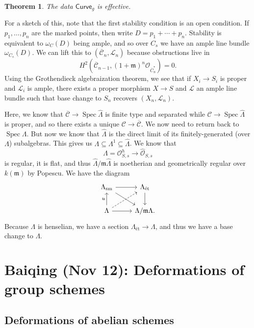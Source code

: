 \documentclass[leqno, openany]{memoir}
\newtheorem{thm}{Theorem}[section]
\theoremstyle{definition}
\theoremstyle{remark}
\theoremstyle{plain}
\theoremstyle{definition}
\theoremstyle{remark}
\newcommand{\mc}[1]{\mathcal{#1}}
\newcommand{\mf}[1]{\mathfrak{#1}}
\newcommand{\mr}[1]{\mathrm{#1}}
\newcommand{\ms}[1]{\mathsf{#1}}
\newcommand{\ol}[1]{\overline{#1}}
\newcommand{\wh}[1]{\widehat{#1}}
\DeclareMathOperator{\Spec}{Spec}
\begin{document}
\begin{thm}
    The data $\ms{Curve}_g$ is effective.
\end{thm}

For a sketch of this, note that the first stability condition is an open condition. If $p_1, \ldots, p_n$ are the marked points, then write $D = p_1 + \cdots + p_n$. Stability is equivalent to $\omega_C(D)$ being ample, and so over $C_s$ we have an ample line bundle $\omega_{C_s}(D)$. We can lift this to $(\ol{\mc{C}}_n, \mc{L}_n)$ because obstructions live in
\[ H^2(\ol{{\mc{C}}}_{n-1}, (1 + \mf{m})^n \mc{O}_{\ol{C}_n^*}) = 0. \]
Using the Grothendieck algebraization theorem, we see that if $X_i \to S_i$ is proper and $\mc{L}_i$ is ample, there exists a proper morphism $X \to S$ and $\mc{L}$ an ample line bundle such that base change to $S_n$ recovers $(X_n, \mc{L}_n)$.

Here, we know that $\ol{\mc{C}} \to \Spec \wh{\Lambda}$ is finite type and separated while $\mc{C} \to \Spec \wh{\Lambda}$ is proper, and so there exists a unique $\mc{C} \to \ol{\mc{C}}$. We now need to return back to $\Spec \Lambda$. But now we know that $\wh{\Lambda}$ is the direct limit of its finitely-generated (over $\Lambda$) subalgebras. This gives us $\Lambda \subseteq \Lambda^1 \subseteq \wh{\Lambda}$. We know that 
\[ \Lambda = \mc{O}_{S,s}^h \to \wh{\mc{O}}_{S,s} \]
is regular, it is flat, and thus $\wh{\Lambda}/\mf{m}\wh{\Lambda}$ is noetherian and geometrically regular over $k(\mf{m})$ by Popescu. We have the diagram
\begin{equation*}
\begin{tikzcd}
    \Lambda_{\mr{sm}} \ar{r} \ar{dr} & \Lambda_{\text{\'et}} \ar{d} \\
    \Lambda \ar{u}{u} \ar{r} \ar[dashrightarrow]{ur} & \Lambda / \mf{m} \Lambda.
\end{tikzcd}
\end{equation*}
Because $\Lambda$ is henselian, we have a section $\Lambda_{\text{\'et}} \to \Lambda$, and thus we have a base change to $\Lambda$.

\chapter{Baiqing (Nov 12): Deformations of group schemes}%
\label{cha:baiqing_nov_12_deformations_of_group_schemes}

\section{Deformations of abelian schemes}%
\label{sec:deformations_of_abelian_schemes}
\end{document}
